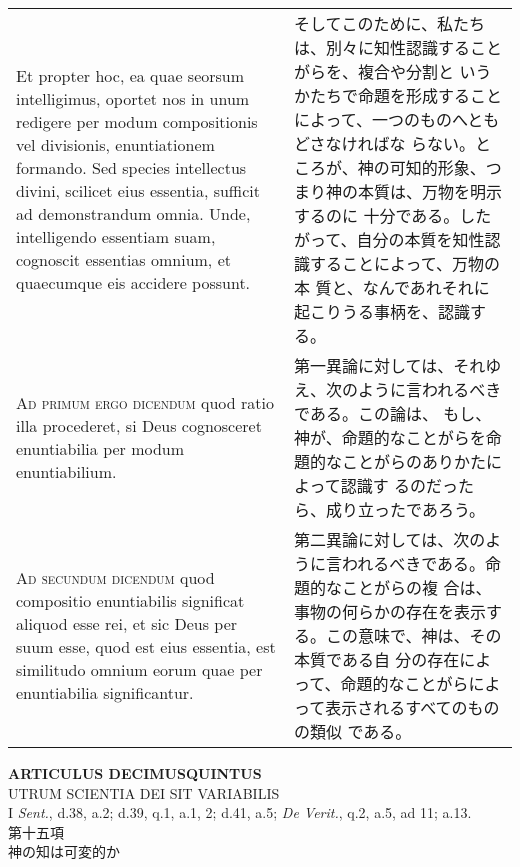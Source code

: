 \documentclass[10pt]{jsarticle} %
\begin{document}
\begin{longtable}{p{21em}p{21em}}
Et propter hoc, ea quae seorsum intelligimus, oportet nos in unum
redigere per modum compositionis vel divisionis, enuntiationem
formando. Sed species intellectus divini, scilicet eius essentia,
sufficit ad demonstrandum omnia. Unde, intelligendo essentiam suam,
cognoscit essentias omnium, et quaecumque eis accidere possunt.


&

そしてこのために、私たちは、別々に知性認識することがらを、複合や分割と
いうかたちで命題を形成することによって、一つのものへともどさなければな
らない。ところが、神の可知的形象、つまり神の本質は、万物を明示するのに
十分である。したがって、自分の本質を知性認識することによって、万物の本
質と、なんであれそれに起こりうる事柄を、認識する。

\\


{\scshape Ad primum ergo dicendum} quod ratio illa procederet, si Deus
cognosceret enuntiabilia per modum enuntiabilium.


&

第一異論に対しては、それゆえ、次のように言われるべきである。この論は、
もし、神が、命題的なことがらを命題的なことがらのありかたによって認識す
るのだったら、成り立ったであろう。

\\


{\scshape Ad secundum dicendum} quod compositio enuntiabilis
significat aliquod esse rei, et sic Deus per suum esse, quod est eius
essentia, est similitudo omnium eorum quae per enuntiabilia
significantur.

&


第二異論に対しては、次のように言われるべきである。命題的なことがらの複
合は、事物の何らかの存在を表示する。この意味で、神は、その本質である自
分の存在によって、命題的なことがらによって表示されるすべてのものの類似
である。

\end{longtable}
\newpage



\begin{center}
{\Large {\bf ARTICULUS DECIMUSQUINTUS}}\\ {\large UTRUM SCIENTIA DEI
SIT VARIABILIS}\\ {\footnotesize I {\itshape Sent.}, d.38, a.2;
d.39, q.1, a.1, 2; d.41, a.5; {\itshape De Verit.}, q.2, a.5,
ad 11; a.13.}\\ {\Large 第十五項\\神の知は可変的か}
\end{center}
\end{document}
